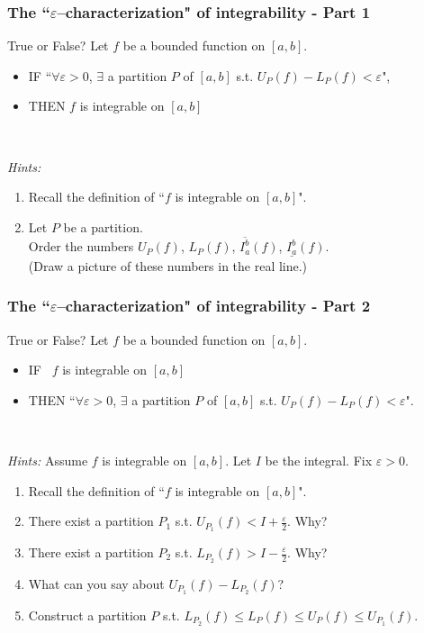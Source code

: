 \documentclass[14pt]{beamer}
\newcommand {\DS} [1] {${\displaystyle #1}$}
\newcommand{\e}{\varepsilon}
\newcommand{\setsize}[1]{\fontsize{#1}{#1}\selectfont} %
\newcommand{\lifab}{\underline{I_a^b}(f)}
\newcommand{\uifab}{\overline{I_a^b}(f)}
\begin{document}
\begin{frame}[t]
\setsize{11}
\frametitle{The ``$\e$--characterization" of integrability - Part 1}

\begin{block}{\setsize{11} True or False?}
	Let $f$ be a bounded function on $[a,b]$.
	\begin{itemize}
			\item	 IF \hfill ``$\forall \varepsilon>0$, $\exists$ a partition $P$ of $[a,b]$ s.t. \DS{U_P(f) - L_P(f) < \varepsilon}", 

			\item	THEN \; $f$ is integrable on $[a,b]$	 
	\end{itemize}
\end{block}

\

\emph{Hints:}
\begin{enumerate}
	\item Recall the definition of ``$f$ is integrable on $[a,b]$".
	\item Let $P$ be a partition.  \\ Order the numbers  \DS{U_P(f)}, \DS{L_P(f)}, \DS{\uifab},  \DS{\lifab}. \\
	(Draw a picture of these numbers in the real line.)
\end{enumerate}

\end{frame}
\begin{frame}[t]
\setsize{11}
\frametitle{The ``$\e$--characterization" of integrability - Part 2}

\begin{block}{\setsize{11} True or False?}
	Let $f$ be a bounded function on $[a,b]$.
	\begin{itemize}
			\item  IF \quad \quad \, $f$ is integrable on $[a,b]$ 
			\item	THEN \hfill 
					``$\forall \varepsilon>0$, $\exists$ a partition $P$ of $[a,b]$ s.t. \DS{U_P(f) - L_P(f) < \varepsilon}".
	\end{itemize}
\end{block}

\

\emph{Hints:}  Assume $f$ is integrable on $[a,b]$.  Let $I$ be the integral.  Fix $\varepsilon>0$.
\begin{enumerate}
	\item Recall the definition of ``$f$ is integrable on $[a,b]$".
	\item  There exist a partition $P_1$ s.t.  
		\DS{ U_{P_1}(f) < I + \frac{\varepsilon}{2}}.  Why?
	\item  There exist a partition $P_2$ s.t.  
		\DS{ L_{P_2}(f) > I - \frac{\varepsilon}{2}}.  Why?
	\item What can you say about \DS{U_{P_1}(f) - L_{P_2}(f)}?
	\vspace{.1cm}
	\item Construct a partition $P$ s.t. \DS{L_{P_2}(f) \leq L_P(f) \leq U_P(f) \leq U_{P_1}(f)}.
\end{enumerate}


\end{frame}
\end{document}
